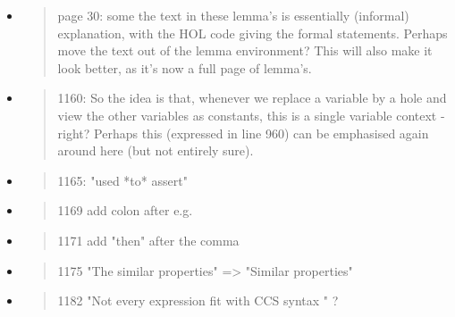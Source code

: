 \begin{itemize}

  \item \begin{quote}
page 30: some the text in these lemma's is essentially (informal) explanation, with the HOL code giving the formal statements. Perhaps move the text out of the lemma environment? This will also make it look better, as it's now a full page of lemma's. 
\end{quote}
  \Mark


  \item \begin{quote}
1160: So the idea is that, whenever we replace a variable by a hole and view the other variables as constants, this is a single variable context - right? Perhaps this (expressed in line 960) can be emphasised again around here (but not entirely sure). 
\end{quote}
  \Mark

  \item \begin{quote}
1165: "used *to* assert"
\end{quote}
  \Mark

  \item \begin{quote}
1169 add colon after e.g.
\end{quote}
  \Mark

  \item \begin{quote}
1171 add "then" after the comma 
\end{quote}
  \Mark

  \item \begin{quote}
1175 "The similar properties" => "Similar properties"
\end{quote}
  \Mark

  \item \begin{quote}
1182 "Not every expression fit with CCS syntax " ?
\end{quote}
  \Mark


\end{itemize}
